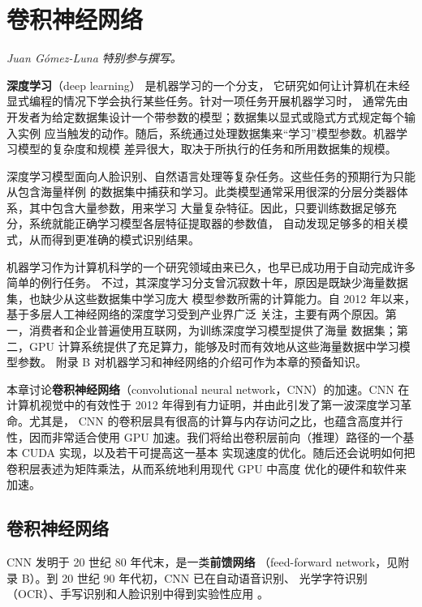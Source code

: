 \chapter{卷积神经网络}
\label{chap:convolutional-neural-networks}
\chaptercontents

\setcounter{footnote}{0}

\noindent\textit{Juan G\'omez-Luna 特别参与撰写。}

\textbf{深度学习}（deep learning）\cite{ch19-lecun2015deep} 是机器学习的一个分支，
它研究如何让计算机在未经显式编程的情况下学会执行某些任务。针对一项任务开展机器学习时，
通常先由开发者为给定数据集设计一个带参数的模型；数据集以显式或隐式方式规定每个输入实例
应当触发的动作。随后，系统通过处理数据集来“学习”模型参数。机器学习模型的复杂度和规模
差异很大，取决于所执行的任务和所用数据集的规模。

深度学习模型面向人脸识别、自然语言处理等复杂任务。这些任务的预期行为只能从包含海量样例
的数据集中捕获和学习。此类模型通常采用很深的分层分类器体系，其中包含大量参数，用来学习
大量复杂特征。因此，只要训练数据足够充分，系统就能正确学习模型各层特征提取器的参数值，
自动发现足够多的相关模式，从而得到更准确的模式识别结果。

机器学习作为计算机科学的一个研究领域由来已久，也早已成功用于自动完成许多简单的例行任务。
不过，其深度学习分支曾沉寂数十年，原因是既缺少海量数据集，也缺少从这些数据集中学习庞大
模型参数所需的计算能力。自 2012 年以来，基于多层人工神经网络的深度学习受到产业界广泛
关注，主要有两个原因。第一，消费者和企业普遍使用互联网，为训练深度学习模型提供了海量
数据集；第二，GPU 计算系统提供了充足算力，能够及时而有效地从这些海量数据中学习模型参数。
附录 B 对机器学习和神经网络的介绍可作为本章的预备知识。

本章讨论\textbf{卷积神经网络}（convolutional neural network，CNN）的加速。CNN 在
计算机视觉中的有效性于 2012 年得到有力证明，并由此引发了第一波深度学习革命。尤其是，
CNN 的卷积层具有很高的计算与内存访问之比，也蕴含高度并行性，因而非常适合使用 GPU
加速。我们将给出卷积层前向（推理）路径的一个基本 CUDA 实现，以及若干可提高这一基本
实现速度的优化。随后还会说明如何把卷积层表述为矩阵乘法，从而系统地利用现代 GPU 中高度
优化的硬件和软件来加速。

\section{卷积神经网络}
\label{sec:cnn}

CNN 发明于 20 世纪 80 年代末\cite{ch19-lecun1998gradient}，是一类\textbf{前馈网络}
（feed-forward network，见附录 B）。到 20 世纪 90 年代初，CNN 已在自动语音识别、
光学字符识别（OCR）、手写识别和人脸识别中得到实验性应用
\cite{ch19-lecun1989handwritten}。

